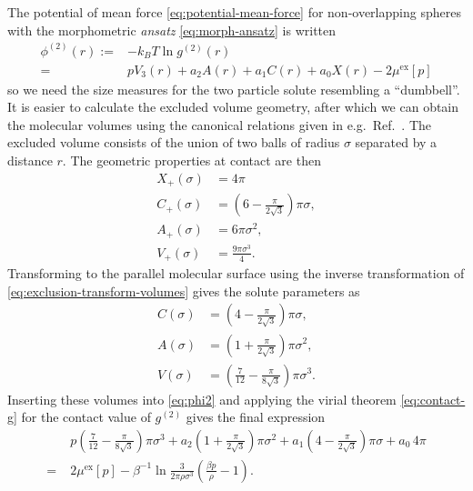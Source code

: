 \documentclass[11pt,twoside]{report}
\begin{document}
The potential of mean force \eqref{eq:potential-mean-force} for non-overlapping spheres with the morphometric \emph{ansatz} \eqref{eq:morph-ansatz} is written
\begin{equation}\label{eq:phi2}
  \begin{split}
    \phi^{(2)}(r)
    :=&
    - k_B T \ln g^{(2)}(r)
    \\ =&
    p V_3(r) + a_2 A (r) + a_1 C(r) + a_0 X(r) - 2\mu^\mathrm{ex}[p]
  \end{split}
\end{equation}
so we need the size measures for the two particle solute resembling a ``dumbbell''.
It is easier to calculate the excluded volume geometry, after which we can obtain the molecular volumes using the canonical relations given in e.g.\ Ref.\ \cite{OettelEL2009}.
The excluded volume consists of the union of two balls of radius $\sigma$ separated by a distance $r$.
The geometric properties at contact are then \cite{OettelEL2009}
\begin{align*}
  X_+(\sigma)
  &=
  4 \pi
  \\
  C_+(\sigma)
  &=
  \left( 6 - \frac{\pi}{2\sqrt{3}} \right) \pi \sigma,
  \\
  A_+(\sigma)
  &=
  6 \pi \sigma^2,
  \\
  V_+(\sigma)
  &=
  \frac{9 \pi \sigma^3}{4}.
\end{align*}
Transforming to the parallel molecular surface using the inverse transformation of \eqref{eq:exclusion-transform-volumes} gives the solute parameters as
\begin{subequations}
  \begin{align}
    C(\sigma)
    &=
    \left( 4 - \frac{\pi}{2\sqrt{3}} \right) \pi \sigma,
    \\
    A(\sigma)
    &=
    \left( 1 + \frac{\pi}{2\sqrt{3}} \right) \pi \sigma^2,
    \\
    V(\sigma)
    &=
    \left( \frac{7}{12} - \frac{\pi}{8\sqrt{3}} \right) \pi \sigma^3.
  \end{align}
\end{subequations}
Inserting these volumes into \eqref{eq:phi2} and applying the virial theorem \eqref{eq:contact-g} for the contact value of $g^{(2)}$ gives the final expression
\begin{align}\label{eq:v-virial}
  &
  p \left( \frac{7}{12} - \frac{\pi}{8\sqrt{3}} \right) \pi \sigma^3
  + a_2 \left( 1 + \frac{\pi}{2\sqrt{3}} \right) \pi \sigma^2
  + a_1 \left( 4 - \frac{\pi}{2\sqrt{3}} \right) \pi \sigma
  + a_0 \, 4\pi
  \nonumber \\ = \; &
  2\mu^\mathrm{ex}[p] - \beta^{-1} \ln{\frac{3}{2\pi \rho \sigma^3} \left( \frac{\beta p}{\rho} - 1 \right)}.
\end{align}
\end{document}
